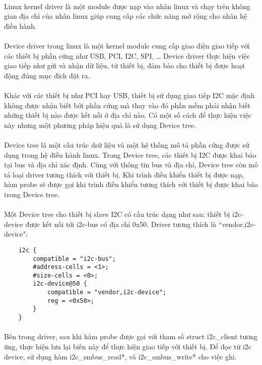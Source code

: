 \paragraph{}
Linux kernel driver là một module được nạp vào nhân linux và chạy trên không gian địa chỉ của nhân linux giúp cung cấp các chức năng mở rộng cho nhân hệ điều hành.
\paragraph{}
Device driver trong linux là một kernel module cung cấp giao diện giao tiếp với các thiết bị phần cứng như USB, PCI, I2C, SPI, … Device driver thực hiện việc giao tiếp như gửi và nhận dữ liệu, từ thiết bị, đảm bảo cho thiết bị được hoạt động đúng mục đích đặt ra.
\paragraph{}
Khác với các thiết bị như PCI hay USB, thiết bị sử dụng giao tiếp I2C mặc định không được nhận biết bởi phần cứng mà thay vào đó phần mềm phải nhận biết những thiết bị nào được kết nối ở địa chỉ nào. Có một số cách để thực hiện việc này nhưng một phương pháp hiệu quả là sử dụng Device tree.
\paragraph{}
Device tree là một cấu trúc dsữ liệu và một hệ thống mô tả phần cứng được sử dụng trong hệ điều hành linux. Trong Device tree, các thiết bị I2C được khai báo tại bus và địa chỉ xác định. Cùng với thông tin bus và địa chỉ, Device tree còn mô tả loại driver tương thích với thiết bị. Khi trình điều khiển thiết bị được nạp, hàm probe sẽ được gọi khi trình điều khiển tương thích với thiết bị được khai báo trong Device tree.
\paragraph{}
Một Device tree cho thiết bị slave I2C có cấu trúc dạng như sau: thiết bị i2c-device được kết nối tới i2c-bus có địa chỉ 0x50. Driver tương thích là “vendor,i2c-device":
\begin{lstlisting}
	i2c {
		compatible = "i2c-bus";
		#address-cells = <1>;
		#size-cells = <0>;
		i2c-device@50 {
			compatible = "vendor,i2c-device";
			reg = <0x50>;
		}
	}
\end{lstlisting}
\paragraph{}
Bên trong driver, sau khi hàm probe được gọi với tham số struct i2c\_client tương ứng, thực hiện lưu lại biến này để thực hiện giao tiếp với thiết bị. Để đọc từ i2c device, sử dụng hàm i2c\_smbus\_read*, và i2c\_smbus\_write* cho việc ghi.

